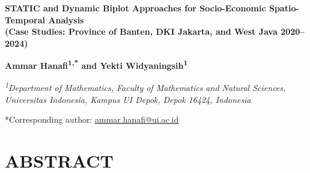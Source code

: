 \documentclass[11pt, a4paper]{article}
\begin{document}
\pagestyle{empty}

\begin{center}
  {\large\bfseries
    STATIC and Dynamic Biplot Approaches for Socio-Economic Spatio-Temporal Analysis \\
    (Case Studies: Province of Banten, DKI Jakarta, and West Java 2020--2024)
  \par}

  \vspace{10pt}

  {\normalsize\bfseries
    Ammar Hanafi\textsuperscript{1,*}
    and
    Yekti Widyaningsih\textsuperscript{1}
  \par}

  \vspace{6pt}

  {\small\itshape
    \textsuperscript{1}Department of Mathematics, Faculty of Mathematics and
    Natural Sciences,\\
    Universitas Indonesia, Kampus UI Depok, Depok 16424, Indonesia
  \par}

  \vspace{4pt}

  {\small
    *Corresponding author:
    \href{mailto:ammar.hanafi@ui.ac.id}{ammar.hanafi@ui.ac.id}
  \par}
\end{center}

\vspace{8pt}

\section*{ABSTRACT}
\end{document}
